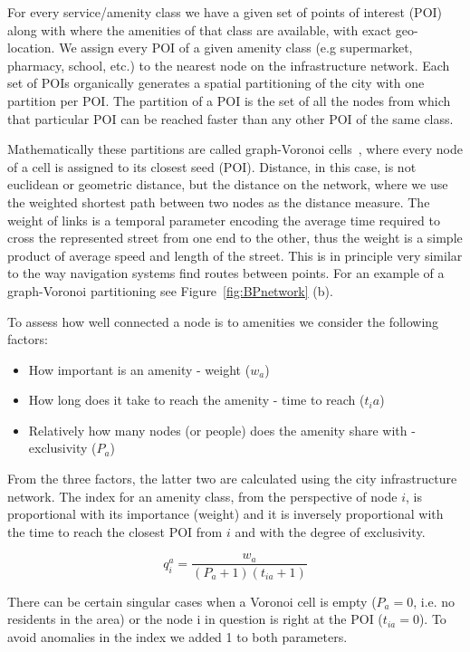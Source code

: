 For every service/amenity class we have a given set of points of interest (POI) along with where the amenities of that class are available, with exact geo-location. We assign every POI of a given amenity class (e.g supermarket, pharmacy, school, etc.) to the nearest node on the infrastructure network. Each set of POIs organically generates a spatial partitioning of the city with one partition per POI. The partition of a POI is the set of all the nodes from which that particular POI can be reached faster than any other POI of the same class.

Mathematically these partitions are called graph-Voronoi cells~\cite{Erwig2000Graph,Deritei2014Community}, where every node of a cell is assigned to its closest seed (POI). Distance, in this case, is not euclidean or geometric distance, but the distance on the network, where we use the weighted shortest path between two nodes as the distance measure. The weight of links is a temporal parameter encoding the average time required to cross the represented street from one end to the other, thus the weight is a simple product of average speed and length of the street. This is in principle very similar to the way navigation systems find routes between points. For an example of a graph-Voronoi partitioning see Figure~\ref{fig:BPnetwork} (b).

To assess how well connected a node is to amenities we consider the following factors:
\begin{itemize}
	\item How important is an amenity - weight ($w_a$)
	\item How long does it take to reach the amenity - time to reach ($t_ia$)
	\item Relatively how many nodes (or people) does the amenity share with - exclusivity ($P_a$)
\end{itemize}

From the three factors, the latter two are calculated using the city infrastructure network. The index for an amenity class, from the perspective of node $i$, is proportional with its importance (weight) and it is inversely proportional with the time to reach the closest POI from $i$ and with the degree of exclusivity.

\begin{equation}\label{q_i}
	q_i^a=\frac{w_{a}}{(P_a+1)(t_{ia}+1)}
\end{equation}

There can be certain singular cases when a Voronoi cell is empty ($P_a=0$, i.e. no residents in the area) or the node i in question is right at the POI ($t_{ia}=0$). To avoid anomalies in the index we added 1 to both parameters.

